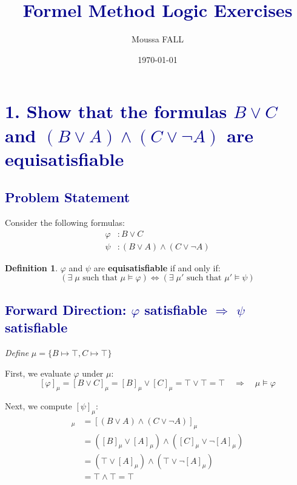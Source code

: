 \documentclass[12pt]{article}
\title{\textcolor{darkblue}{\Large\textbf{Formel Method Logic Exercises}}}
\author{Moussa FALL}
\date{\today}
\theoremstyle{definition}
\newtheorem*{defn}{Definition}
\theoremstyle{plain}
\begin{document}
\maketitle

\section*{\textcolor{darkblue}{1. Show that the formulas $B \vee C$ and $(B \vee A) \wedge (C \vee \neg A)$ are equisatisfiable}}
\subsection*{\textcolor{darkblue}{Problem Statement}}
Consider the following formulas:
\begin{align*}
\varphi &: B \vee C \\
\psi &: (B \vee A) \wedge (C \vee \neg A)
\end{align*}

\begin{defn}
$\varphi$ and $\psi$ are \textbf{equisatisfiable} if and only if:
\[
\left(\exists\; \mu \text{ such that } \mu \models \varphi\right) \Longleftrightarrow \left(\exists\; \mu' \text{ such that } \mu' \models \psi\right)
\]
\end{defn}

\subsection*{\textcolor{darkblue}{Forward Direction: $\varphi$ satisfiable $\Rightarrow$ $\psi$ satisfiable}}

\vspace{0.5cm}
\begin{tcolorbox}[colback=lightgray, colframe=darkblue, boxrule=1pt]
\textit{Define} $\mu = \{ B \mapsto \top, C \mapsto \top \}$
\end{tcolorbox}

\vspace{0.3cm}
\noindent
First, we evaluate $\varphi$ under $\mu$:
\[
[\varphi]_\mu = [B \vee C]_\mu = [B]_\mu \vee [C]_\mu = \top \vee \top = \top \quad \Rightarrow \quad \mu \models \varphi
\]

\vspace{0.3cm}
\noindent
Next, we compute $[\psi]_\mu$:
\begin{align*}
[\psi]_\mu &= [(B \vee A) \wedge (C \vee \neg A)]_\mu \\
&= ([B]_\mu \vee [A]_\mu) \wedge ([C]_\mu \vee \neg[A]_\mu) \\
&= (\top \vee [A]_\mu) \wedge (\top \vee \neg[A]_\mu) \\
&= \top \wedge \top = \top
\end{align*}
\end{document}
